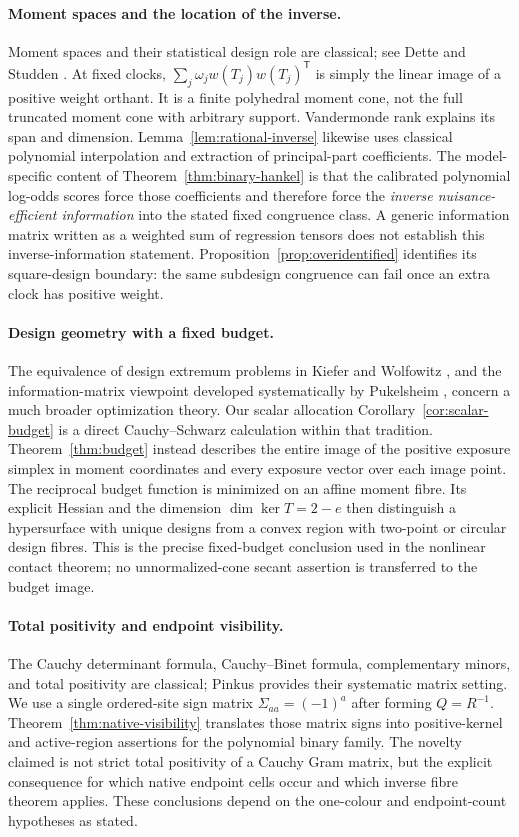 \paragraph{Moment spaces and the location of the inverse.}
Moment spaces and their statistical design role are classical; see Dette and Studden \cite{DS}. At fixed clocks, $\sum_j\omega_jw(T_j)w(T_j)^{\mathsf T}$ is simply the linear image of a positive weight orthant. It is a finite polyhedral moment cone, not the full truncated moment cone with arbitrary support. Vandermonde rank explains its span and dimension. Lemma~\ref{lem:rational-inverse} likewise uses classical polynomial interpolation and extraction of principal-part coefficients. The model-specific content of Theorem~\ref{thm:binary-hankel} is that the calibrated polynomial log-odds scores force those coefficients and therefore force the \emph{inverse nuisance-efficient information} into the stated fixed congruence class. A generic information matrix written as a weighted sum of regression tensors does not establish this inverse-information statement. Proposition~\ref{prop:overidentified} identifies its square-design boundary: the same subdesign congruence can fail once an extra clock has positive weight.

\paragraph{Design geometry with a fixed budget.}
The equivalence of design extremum problems in Kiefer and Wolfowitz \cite{KW}, and the information-matrix viewpoint developed systematically by Pukelsheim \cite{Pukelsheim}, concern a much broader optimization theory. Our scalar allocation Corollary~\ref{cor:scalar-budget} is a direct Cauchy--Schwarz calculation within that tradition. Theorem~\ref{thm:budget} instead describes the entire image of the positive exposure simplex in moment coordinates and every exposure vector over each image point. The reciprocal budget function is minimized on an affine moment fibre. Its explicit Hessian and the dimension $\dim\ker T=2-e$ then distinguish a hypersurface with unique designs from a convex region with two-point or circular design fibres. This is the precise fixed-budget conclusion used in the nonlinear contact theorem; no unnormalized-cone secant assertion is transferred to the budget image.

\paragraph{Total positivity and endpoint visibility.}
The Cauchy determinant formula, Cauchy--Binet formula, complementary minors, and total positivity are classical; Pinkus \cite{Pinkus} provides their systematic matrix setting. We use a single ordered-site sign matrix $\Sigma_{aa}=(-1)^a$ after forming $Q=R^{-1}$. Theorem~\ref{thm:native-visibility} translates those matrix signs into positive-kernel and active-region assertions for the polynomial binary family. The novelty claimed is not strict total positivity of a Cauchy Gram matrix, but the explicit consequence for which native endpoint cells occur and which inverse fibre theorem applies. These conclusions depend on the one-colour and endpoint-count hypotheses as stated.

